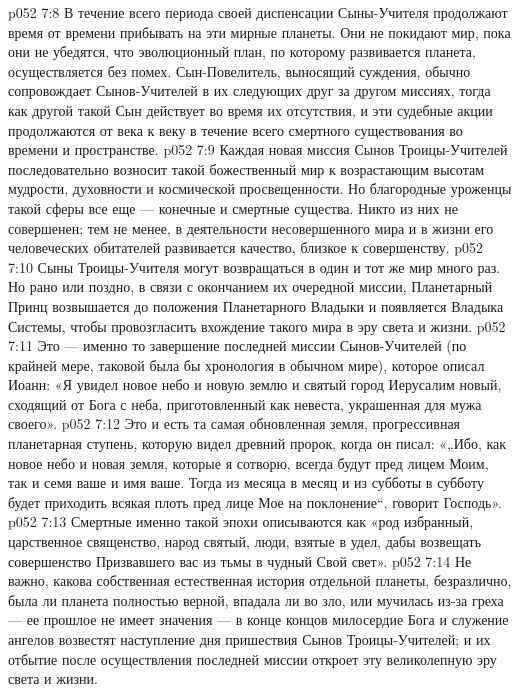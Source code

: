 \vs p052 7:8 \pc В течение всего периода своей диспенсации Сыны\hyp{}Учителя продолжают время от времени прибывать на эти мирные планеты. Они не покидают мир, пока они не убедятся, что эволюционный план, по которому развивается планета, осуществляется без помех. Сын\hyp{}Повелитель, выносящий суждения, обычно сопровождает Сынов\hyp{}Учителей в их следующих друг за другом миссиях, тогда как другой такой Сын действует во время их отсутствия, и эти судебные акции продолжаются от века к веку в течение всего смертного существования во времени и пространстве.
\vs p052 7:9 Каждая новая миссия Сынов Троицы\hyp{}Учителей последовательно возносит такой божественный мир к возрастающим высотам мудрости, духовности и космической просвещенности. Но благородные уроженцы такой сферы все еще --- конечные и смертные существа. Никто из них не совершенен; тем не менее, в деятельности несовершенного мира и в жизни его человеческих обитателей развивается качество, близкое к совершенству.
\vs p052 7:10 \pc Сыны Троицы\hyp{}Учителя могут возвращаться в один и тот же мир много раз. Но рано или поздно, в связи с окончанием их очередной миссии, Планетарный Принц возвышается до положения Планетарного Владыки и появляется Владыка Системы, чтобы провозгласить вхождение такого мира в эру света и жизни.
\vs p052 7:11 Это --- именно то завершение последней миссии Сынов\hyp{}Учителей (по крайней мере, таковой была бы хронология в обычном мире), которое описал Иоанн: «Я увидел новое небо и новую землю и святый город Иерусалим новый, сходящий от Бога с неба, приготовленный как невеста, украшенная для мужа своего».
\vs p052 7:12 Это и есть та самая обновленная земля, прогрессивная планетарная ступень, которую видел древний пророк, когда он писал: «„Ибо, как новое небо и новая земля, которые я сотворю, всегда будут пред лицем Моим, так и семя ваше и имя ваше. Тогда из месяца в месяц и из субботы в субботу будет приходить всякая плоть пред лице Мое на поклонение“, говорит Господь».
\vs p052 7:13 Смертные именно такой эпохи описываются как «род избранный, царственное священство, народ святый, люди, взятые в удел, дабы возвещать совершенство Призвавшего вас из тьмы в чудный Свой свет».
\vs p052 7:14 \pc Не важно, какова собственная естественная история отдельной планеты, безразлично, была ли планета полностью верной, впадала ли во зло, или мучилась из\hyp{}за греха --- ее прошлое не имеет значения --- в конце концов милосердие Бога и служение ангелов возвестят наступление дня пришествия Сынов Троицы\hyp{}Учителей; и их отбытие после осуществления последней миссии откроет эту великолепную эру света и жизни.
